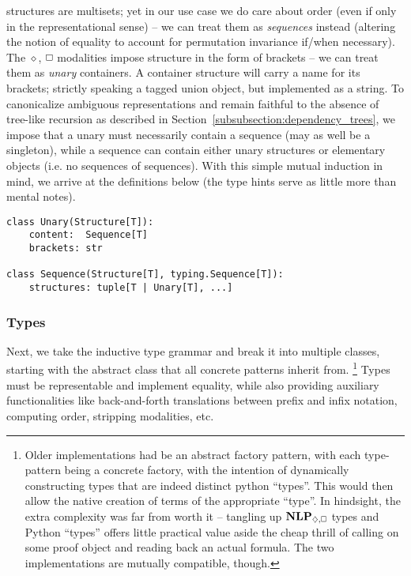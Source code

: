 \noindent\NLP{} structures are multisets; yet in our use case we do care about order (even if only in the representational sense) -- we can treat them as \textit{sequences} instead (altering the notion of equality to account for permutation invariance if/when necessary).
The $\diamond$, $\bx$ modalities impose structure in the form of brackets -- we can treat them as \textit{unary} containers.
A container structure will carry a name for its brackets; strictly speaking a tagged union object, but implemented as a string.
To canonicalize ambiguous representations and remain faithful to the absence of tree-like recursion as described in Section~\ref{subsubsection:dependency_trees}, we impose that a unary must necessarily contain a sequence (may as well be a singleton), while a sequence can contain either unary structures or elementary objects (i.e. no sequences of sequences).
With this simple mutual induction in mind, we arrive at the definitions below (the type hints serve as little more than mental notes).

\begin{verbatim}
class Unary(Structure[T]):
	content:  Sequence[T]
	brackets: str

class Sequence(Structure[T], typing.Sequence[T]):
	structures: tuple[T | Unary[T], ...]
\end{verbatim}

\subsubsection{Types}
Next, we take the inductive type grammar and break it into multiple classes, starting with the abstract class that all concrete patterns inherit from.%
	\footnote{Older implementations had  be an abstract factory pattern, with each type-pattern being a concrete factory, with the intention of dynamically constructing types that are indeed distinct python ``types''.
	This would then allow the native creation of terms of the appropriate ``type''. 
	In hindsight, the extra complexity was far from worth it -- tangling up $\NLPplus{}$ types and Python ``types'' offers little practical value aside the cheap thrill of calling  on some proof object and reading back an actual formula.
	The two implementations are mutually compatible, though.}
Types must be representable and implement equality, while also providing auxiliary functionalities like back-and-forth translations between prefix and infix notation, computing order, stripping modalities, etc.

